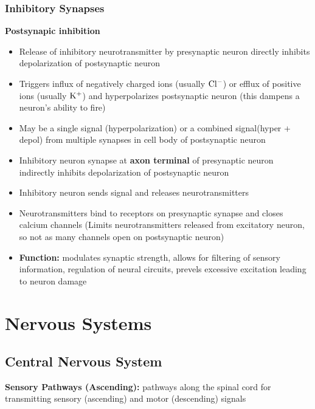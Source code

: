\documentclass[11pt,fleqn]{book} %
\begin{document}
\subsection{Inhibitory Synapses}
\textbf{Postsynapic inhibition}\\
\begin{itemize}
    \item Release of inhibitory neurotransmitter by presynaptic neuron directly inhibits depolarization of postsynaptic neuron
    \item Triggers influx of negatively charged ions (usually ${\rm Cl^-}$) or efflux of positive ions (usually ${\rm K^+}$) and hyperpolarizes postsynaptic neuron  (this dampens a neuron's ability to fire)
    \item May be a single signal (hyperpolarization) or a combined signal(hyper + depol) from multiple synapses in cell body of postsynaptic neuron
    \item Inhibitory neuron synapse at \textbf{axon terminal} of presynaptic neuron indirectly inhibits depolarization of postsynaptic neuron
    \item Inhibitory neuron sends signal and releases neurotransmitters
    \item Neurotransmitters bind to receptors on presynaptic synapse and closes calcium channels (Limits neurotransmitters released from excitatory neuron, so not as many channels open on postsynaptic neuron)
    \item \textbf{Function:} modulates synaptic strength, allows for filtering of sensory information, regulation of neural circuits, prevels excessive excitation leading to neuron damage
\end{itemize}

\chapter{Nervous Systems}
\section{Central Nervous System}
\textbf{Sensory Pathways (Ascending):} pathways along the spinal cord for transmitting sensory (ascending) and motor (descending) signals
\end{document}
